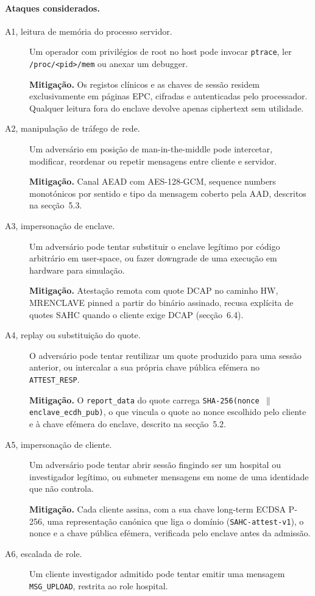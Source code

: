 \paragraph{Ataques considerados.}

\begin{description}
  \item[A1, leitura de memória do processo servidor.] Um operador com privilégios de root no host pode invocar \texttt{ptrace}, ler \texttt{/proc/<pid>/mem} ou anexar um debugger.

  \textbf{Mitigação.} Os registos clínicos e as chaves de sessão residem exclusivamente em páginas EPC, cifradas e autenticadas pelo processador. Qualquer leitura fora do enclave devolve apenas ciphertext sem utilidade.
  \item[A2, manipulação de tráfego de rede.] Um adversário em posição de man-in-the-middle pode intercetar, modificar, reordenar ou repetir mensagens entre cliente e servidor.

  \textbf{Mitigação.} Canal AEAD com AES-128-GCM, sequence numbers monotónicos por sentido e tipo da mensagem coberto pela AAD, descritos na secção~5.3.
  \item[A3, impersonação de enclave.] Um adversário pode tentar substituir o enclave legítimo por código arbitrário em user-space, ou fazer downgrade de uma execução em hardware para simulação.

  \textbf{Mitigação.} Atestação remota com quote DCAP no caminho HW, MRENCLAVE pinned a partir do binário assinado, recusa explícita de quotes SAHC quando o cliente exige DCAP (secção~6.4).
  \item[A4, replay ou substituição do quote.] O adversário pode tentar reutilizar um quote produzido para uma sessão anterior, ou intercalar a sua própria chave pública efémera no \texttt{ATTEST\_RESP}.

  \textbf{Mitigação.} O \texttt{report\_data} do quote carrega \texttt{SHA-256(nonce $\|$ enclave\_ecdh\_pub)}, o que vincula o quote ao nonce escolhido pelo cliente e à chave efémera do enclave, descrito na secção~5.2.
  \item[A5, impersonação de cliente.] Um adversário pode tentar abrir sessão fingindo ser um hospital ou investigador legítimo, ou submeter mensagens em nome de uma identidade que não controla.

  \textbf{Mitigação.} Cada cliente assina, com a sua chave long-term ECDSA P-256, uma representação canónica que liga o domínio (\texttt{SAHC-attest-v1}), o nonce e a chave pública efémera, verificada pelo enclave antes da admissão.
  \item[A6, escalada de role.] Um cliente investigador admitido pode tentar emitir uma mensagem \texttt{MSG\_UPLOAD}, restrita ao role hospital.


\end{description}
